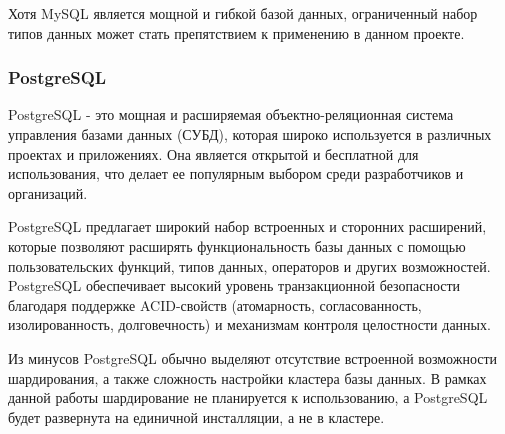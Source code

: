 Хотя MySQL является мощной и гибкой базой данных, ограниченный набор типов данных может стать препятствием к применению в данном проекте.


\subsubsection{PostgreSQL}

PostgreSQL - это мощная и расширяемая объектно-реляционная система управления базами данных (СУБД), которая широко используется в различных проектах и приложениях. Она является открытой и бесплатной для использования, что делает ее популярным выбором среди разработчиков и организаций. 

PostgreSQL предлагает широкий набор встроенных и сторонних расширений, которые позволяют расширять функциональность базы данных с помощью пользовательских функций, типов данных, операторов и других возможностей. PostgreSQL обеспечивает высокий уровень транзакционной безопасности благодаря поддержке ACID-свойств (атомарность, согласованность, изолированность, долговечность) и механизмам контроля целостности данных.

Из минусов PostgreSQL обычно выделяют отсутствие встроенной возможности шардирования, а также сложность настройки кластера базы данных. В рамках данной работы шардирование не планируется к использованию, а PostgreSQL будет развернута на единичной инсталляции, а не в кластере.

\pagebreak
